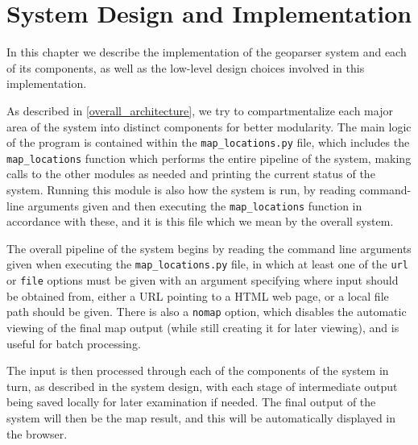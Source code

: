 \documentclass[12pt, a4paper]{report}
\begin{document}




\chapter{System Design and Implementation}
\label{chap:implementation}

In this chapter we describe the implementation of the geoparser system and each of its components, as well as the low-level design choices involved in this implementation.

As described in \ref{overall_architecture}, we try to compartmentalize each major area of the system into distinct components for better modularity. The main logic of the program is contained within the \verb#map_locations.py# file, which includes the \verb#map_locations# function which performs the entire pipeline of the system, making calls to the other modules as needed and printing the current status of the system. Running this module is also how the system is run, by reading command-line arguments given and then executing the \verb#map_locations# function in accordance with these, and it is this file which we mean by the overall system.

The overall pipeline of the system begins by reading the command line arguments given when executing the \verb#map_locations.py# file, in which at least one of the \verb#url# or \verb#file# options must be given with an argument specifying where input should be obtained from, either a URL pointing to a HTML web page, or a local file path should be given. There is also a \verb#nomap# option, which disables the automatic viewing of the final map output (while still creating it for later viewing), and is useful for batch processing.

The input is then processed through each of the components of the system in turn, as described in the system design, with each stage of intermediate output being saved locally for later examination if needed. The final output of the system will then be the map result, and this will be automatically displayed in the browser.
\end{document}
